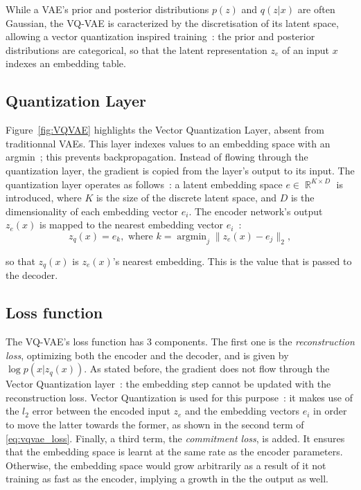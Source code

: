 \documentclass{article}
\DeclareMathOperator*{\argmin}{argmin}
\DeclareMathOperator{\RR}{\mathbb{R}}
\begin{document}
While a VAE's prior and posterior distributions $p(z)$ and $q(z|x)$ are often Gaussian, the VQ-VAE is caracterized by the discretisation of its latent space, allowing a vector quantization inspired training~: the prior and posterior distributions are categorical, so that the latent representation $z_e$ of an input $x$ indexes an embedding table.

\subsection{Quantization Layer}

Figure~\ref{fig:VQVAE} highlights the Vector Quantization Layer, absent from traditionnal VAEs. This layer indexes values to an embedding space with an argmin~; this prevents backpropagation. Instead of flowing through the quantization layer, the gradient is copied from the layer's output to its input.
The quantization layer operates as follows~: a latent embedding space $e\in \RR^{K \times D}$ is introduced, where $K$ is the size of the discrete latent space, and $D$ is the dimensionality of each embedding vector $e_i$. The encoder network's output $z_e(x)$ is mapped to the nearest embedding vector $e_i$~:
\begin{equation}
    z_q(x)=e_k,\text{ where }k=\argmin_j\|z_e(x)-e_j\|_2,
\end{equation}

so that $z_q(x)$ is $z_e(x)$'s nearest embedding. This is the value that is passed to the decoder.

\subsection{Loss function}

The VQ-VAE's loss function has 3 components. The first one is the \textit{reconstruction loss}, optimizing both the encoder and the decoder, and is given by $\log p(x|z_q(x))$. As stated before, the gradient does not flow through the Vector Quantization layer~: the embedding step cannot be updated with the reconstruction loss. Vector Quantization is used for this purpose~: it makes use of the $l_2$ error between the encoded input $z_e$ and the embedding vectors $e_i$ in order to move the latter towards the former, as shown in the second term of \autoref{eq:vqvae_loss}. Finally, a third term, the \textit{commitment loss}, is added. It ensures that the embedding space is learnt at the same rate as the encoder parameters. Otherwise, the embedding space would grow arbitrarily as a result of it not training as fast as the encoder, implying a growth in the the output as well. 
\end{document}
